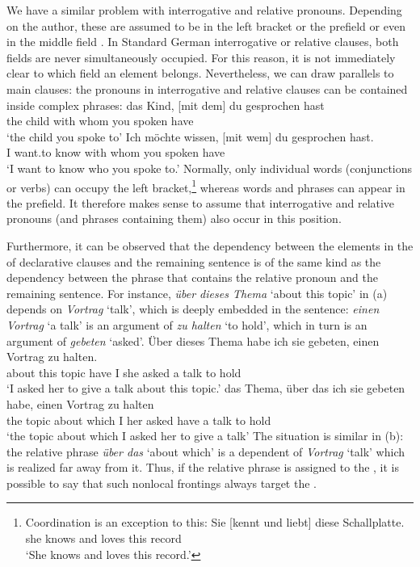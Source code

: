 We have a similar problem with interrogative and
relative pronouns. Depending on the author, these are assumed to be in the left bracket
\parencites{Kathol2001a}[--95]{Duerscheid2003a-u}[]{Eisenberg2004a}[, 57, 69--70]{Pafel2011a-u} or the prefield
\parencites[§1345]{Duden2005-Authors}[--30, Section~3.1]{Woellstein2010a-u} or even
in the middle field \citep[]{AH2004a-u}. In Standard German interrogative or relative
clauses, both fields are never simultaneously
occupied. For this reason, it is not immediately clear to which field an element
belongs. Nevertheless, we can draw parallels to main clauses: the pronouns in  interrogative and
relative clauses can be contained inside complex phrases: 
\eal
\ex 
\gll das Kind,         [mit dem] du gesprochen hast\\
     the child \spacebr{}with whom you spoken have\\
\glt `the child you spoke to'	 
\ex 
\gll Ich möchte wissen, [mit wem] du gesprochen hast.\\
     I want.to know \spacebr{}with whom you spoken have\\
\glt `I want to know who you spoke to.'
\zl
Normally, only individual words (conjunctions or verbs) can occupy the left bracket,\footnote{%
 Coordination is an exception to this:
\ea
\gll Sie [kennt und liebt] diese Schallplatte.\\
     she \spacebr{}knows and loves this record\\
\glt `She knows and loves this record.'
\z
} 
whereas words and phrases can appear in the prefield. It therefore makes sense to assume that interrogative and relative pronouns (and phrases containing them)
also occur in this position. 

Furthermore, it can be observed that the dependency between the elements in the \vf of declarative
clauses and the remaining sentence is of the same kind as the dependency between the phrase that
contains the relative pronoun and the remaining sentence. For instance, \emph{über dieses Thema}
`about this topic' in (a)
depends on \emph{Vortrag} `talk', which is deeply embedded in the sentence:
\emph{einen Vortrag} `a talk' is an argument of \emph{zu halten} `to hold', which in turn is an
argument of \emph{gebeten} `asked'.
\eal
\ex 
\gll Über dieses Thema habe ich sie gebeten, einen Vortrag zu halten.\\
     about this topic  have I   she asked    a     talk    to hold\\
\glt `I asked her to give a talk about this topic.'
\ex 
\gll das Thema, über das ich sie gebeten habe, einen Vortrag zu halten\\
     the topic  about which I her asked have a talk to hold\\
\glt `the topic about which I asked her to give a talk'
\zl
The situation is similar in (b): the relative phrase \emph{über das} `about which' is a dependent of
\emph{Vortrag} `talk' which is realized far away from it. Thus, if the relative phrase is assigned to the \vf, it is
possible to say that such nonlocal frontings always target the \vf.


